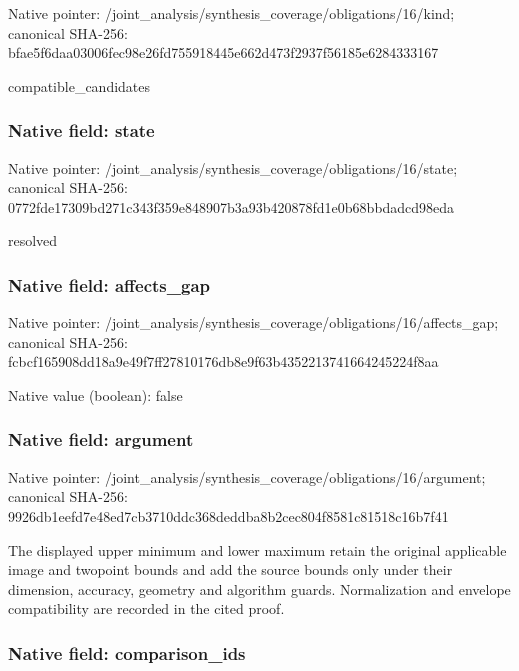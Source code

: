 \documentclass[10pt,a4paper]{article}
\begin{document}
Native pointer: /joint\_analysis/synthesi\allowbreak{}s\_coverage/obligations/1\allowbreak{}6/kind; canonical SHA-256: bfae5f6daa03006fec98e26f\allowbreak{}d755918445e662d473f2937f\allowbreak{}56185e6284333167


compatible\_candidates


\subsubsection{Native field: state}


Native pointer: /joint\_analysis/synthesi\allowbreak{}s\_coverage/obligations/1\allowbreak{}6/state; canonical SHA-256: 0772fde17309bd271c343f35\allowbreak{}9e848907b3a93b420878fd1e\allowbreak{}0b68bbdadcd98eda


resolved


\subsubsection{Native field: affects\_gap}


Native pointer: /joint\_analysis/synthesi\allowbreak{}s\_coverage/obligations/1\allowbreak{}6/affects\_gap; canonical SHA-256: fcbcf165908dd18a9e49f7ff\allowbreak{}27810176db8e9f63b4352213\allowbreak{}741664245224f8aa



Native value (boolean): false



\subsubsection{Native field: argument}


Native pointer: /joint\_analysis/synthesi\allowbreak{}s\_coverage/obligations/1\allowbreak{}6/argument; canonical SHA-256: 9926db1eefd7e48ed7cb3710\allowbreak{}ddc368deddba8b2cec804f85\allowbreak{}81c81518c16b7f41


The displayed upper minimum and lower maximum retain the original applicable image and twopoint bounds and add the source bounds only under their dimension, accuracy, geometry and algorithm guards. Normalization and envelope compatibility are recorded in the cited proof.


\subsubsection{Native field: comparison\_ids}
\end{document}
